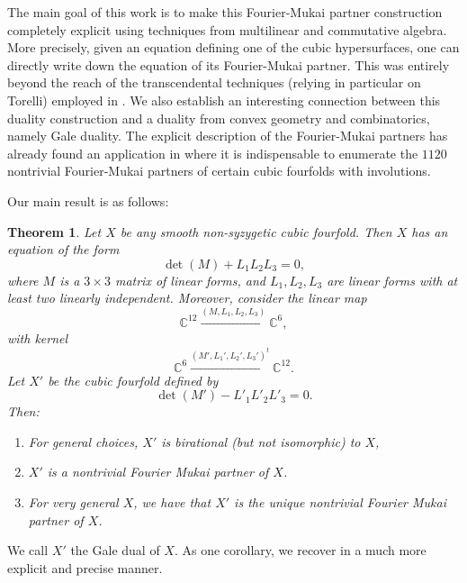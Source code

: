 \documentclass[11pt]{amsart}
\theoremstyle{plain}
\newtheorem{theorem}{Theorem}[section]
\numberwithin{equation}{section}
\theoremstyle{definition}
\theoremstyle{remark}
\newcommand{\C}{\mathbb C}
\newcommand{\bC}{\mathbb{C}}
\begin{document}
The main goal of this work is to make this Fourier-Mukai partner construction completely explicit using techniques from multilinear and commutative algebra. More precisely, given an equation defining one of the cubic hypersurfaces, one can directly write down the equation of its Fourier-Mukai partner. This was entirely beyond the reach of the transcendental techniques (relying in particular on Torelli) employed in \cite{Brooke:2024aa}. We also establish an interesting connection between this duality construction and a duality from convex geometry and combinatorics, namely Gale duality. The explicit description of the Fourier-Mukai partners has already found an application in \cite{BGvBM25} where it is indispensable to enumerate the $1120$ nontrivial Fourier-Mukai partners of  certain cubic fourfolds with involutions. 

Our main result is as follows:

\begin{theorem}
    Let $X$ be any smooth non-syzygetic cubic fourfold. Then $X$ has an equation of the form
    $$\det(M)+L_1L_2L_3=0,$$ where $M$ is a $3\times 3$ matrix of linear forms, and $L_1,L_2, L_3$ are linear forms with at least two linearly independent.
    Moreover, consider the linear map $$\C^{12} \xrightarrow{(M,L_1,L_2,L_3)} \C^6,$$ with kernel $$\C^6\xrightarrow{(M',L_1', L_2', L_3')^t} \bC^{12}.$$  Let $X'$ be the cubic fourfold defined by $$\det(M')-L'_1L'_2L'_3=0.$$ Then:
    \begin{enumerate}
        \item For general choices, $X'$ is birational (but not isomorphic) to $X$,
        \item $X'$ is a nontrivial Fourier Mukai partner of $X$.
        \item For very general $X$, we have that $X'$ is the unique nontrivial Fourier Mukai partner of $X$.
    \end{enumerate}
\end{theorem}
We call $X'$ the Gale dual of $X$. %
As one corollary, we recover \cite[Thm. 3.1]{Brooke:2024aa} in a much more explicit and precise manner.
\end{document}
